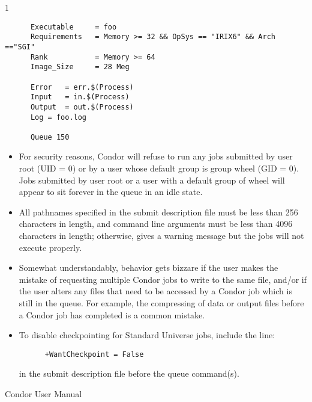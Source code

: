 \begin{ManPage}{\label{man-condor-submit}}{1}
\begin{verbatim}
      Executable     = foo                                                    
      Requirements   = Memory >= 32 && OpSys == "IRIX6" && Arch =="SGI"     
      Rank           = Memory >= 64
      Image_Size     = 28 Meg                                                 
                                                                          
      Error   = err.$(Process)                                                
      Input   = in.$(Process)                                                 
      Output  = out.$(Process)                                                
      Log = foo.log                                                                       
                                                                          
      Queue 150
\end{verbatim}

\GenRem
\begin{itemize}

\item For security reasons, Condor will refuse to run any jobs submitted
by user root (UID = 0) or by a user whose default group is group wheel
(GID = 0). Jobs submitted by user root or a user with a default group of
wheel will appear to sit forever in the queue in an idle state. 

\item All pathnames specified in the submit description file must be
less than 256 characters in length, and command line arguments must be
less than 4096 characters in length; otherwise,  gives a
warning message but the jobs will not execute properly. 

\item Somewhat understandably, behavior gets bizzare if the user makes
the mistake of requesting multiple Condor jobs to write to the
same file, and/or if the user alters any files that need to be accessed
by a Condor job which is still in the queue.
For example, the compressing of data or
output files before a Condor job has completed is a common mistake.

\item To disable checkpointing for Standard Universe jobs, include the
line:
\begin{verbatim}
      +WantCheckpoint = False
\end{verbatim}
in the submit description file before the queue command(s).
\end{itemize}

\SeeAlso
Condor User Manual

\end{ManPage}

